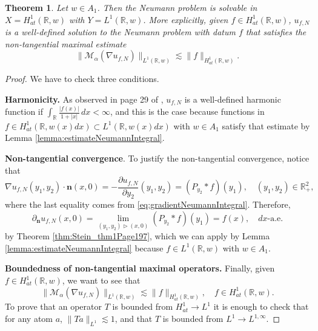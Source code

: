 \documentclass[12pt]{amsart}
\newcommand{\R}{\mathbb{R}}
\theoremstyle{plain}
\newtheorem{theorem}{Theorem}[section]
\theoremstyle{definition}
\numberwithin{equation}{section}
\begin{document}
\begin{theorem}\label{thm:H1SolvabilityHalfPlane}
    Let $w\in A_{1}$. Then the Neumann problem is solvable in $X=H_{at}^{1}(\R,w)$ with $Y=L^1(\R,w)$. More explicitly, given $f\in H_{at}^1(\R,w)$, $u_{f,N}$ is a well-defined solution to the Neumann problem with datum $f$ that satisfies the non-tangential maximal estimate
    \[
    \|\mathcal{M}_{\alpha}(\nabla u_{f,N})\|_{L^1(\R,w)}
    \lesssim 
    \|f\|_{H_{at}^1(\R,w)}.
    \]
\end{theorem}


\begin{proof} We have to check three conditions.

\noindent
    \textbf{Harmonicity.} 
    As observed in page 29 of \cite{CNO}, $u_{f,N}$ is a well-defined harmonic function if $\int_{\R}\frac{|f(x)|}{1+|x|}\, dx<\infty$, and this is the case because functions in $f\in H_{at}^{1}(\R,w(x)dx)\subset L^1(\R,w(x)dx)$ with $w\in A_{1}$ satisfy that estimate by Lemma \ref{lemma:estimateNeumannIntegral}.

    \vspace{0.3cm}\noindent
    \textbf{Non-tangential convergence}. To justify the non-tangential convergence, notice that
    \[
    \nabla u_{f,N}(y_1,y_2)\cdot \mathbf{n}(x,0)
    =
    -\frac{\partial u_{f,N}}{\partial y_2}(y_1,y_2)
    =
    (P_{y_2}\ast f)(y_1), \quad (y_1,y_2)\in\R_{+}^{2},
    \]
    where the last equality comes from \eqref{eq:gradientNeumannIntegral}. Therefore,   
    \[
    \partial_{\mathbf{n}}u_{f,N}(x,0)
    =
    \lim_{(y_1,y_2)\triangleright (x,0)}
    (P_{y_2}\ast f)(y_1)
    =
    f(x),\quad  dx\text{-a.e.}
    \]
    by Theorem \ref{thm:Stein_thm1Page197}, which we can apply by Lemma \ref{lemma:estimateNeumannIntegral} because $f\in L^1(\R,w)$ with $w\in A_{1}$.
    


    \vspace{0.3cm}\noindent
    \textbf{Boundedness of non-tangential maximal operators.} Finally, given $f\in H_{at}^{1}(\R,w)$, we want to see that
    \[
    \|\mathcal{M}_{\alpha}(\nabla u_{f,N})\|_{L^1(\R,w)}
    \lesssim 
    \|f\|_{H_{at}^1(\R,w)},\quad f\in H_{at}^{1}(\R,w).
    \]
    To prove that an operator $T$ is bounded from $H_{at}^{1}\to L^1$ it is enough 
     to check that for any atom $a$, $\|Ta\|_{L^1}\lesssim 1$, and that $T$ is bounded from $L^1\to L^{1,\infty}$.
    

\end{proof}
\end{document}
